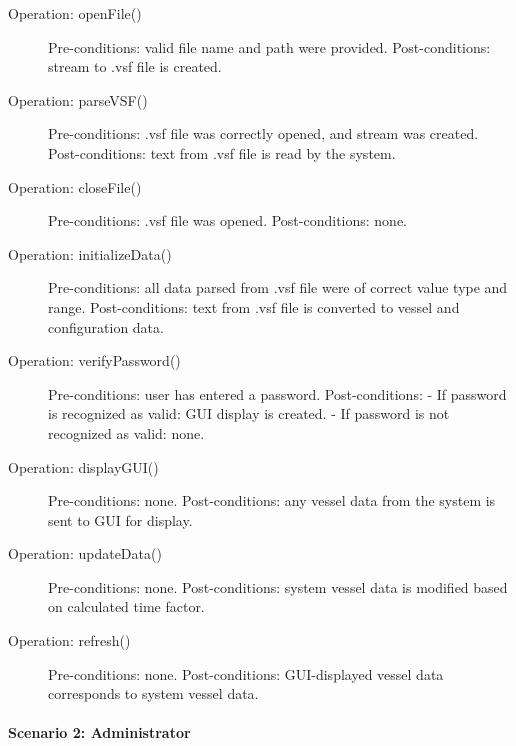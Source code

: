 \documentclass{article}
\begin{document}
\begin{description}
  \item[Operation: openFile()] Pre-conditions: valid file name and path were provided.\newline
  Post-conditions: stream to .vsf file is created.
  \item[Operation: parseVSF()] Pre-conditions: .vsf file was correctly opened, and stream was created.\newline
  Post-conditions: text from .vsf file is read by the system.
  \item[Operation: closeFile()] Pre-conditions: .vsf file was opened.\newline
  Post-conditions: none.
  \item[Operation: initializeData()] Pre-conditions: all data parsed from .vsf file were of correct value type and range.\newline
  Post-conditions: text from .vsf file is converted to vessel and configuration data.
  \item[Operation: verifyPassword()] Pre-conditions: user has entered a password.\newline
  Post-conditions:\newline
  - If password is recognized as valid: GUI display is created.\newline
  - If password is not recognized as valid: none.
  \item[Operation: displayGUI()] Pre-conditions: none.\newline
  Post-conditions: any vessel data from the system is sent to GUI for display.
  \item[Operation: updateData()] Pre-conditions: none.\newline
  Post-conditions: system vessel data is modified based on calculated time factor.
  \item[Operation: refresh()] Pre-conditions: none.\newline
  Post-conditions: GUI-displayed vessel data corresponds to system vessel data.
\end{description}

\break
\paragraph{Scenario 2: Administrator}
\end{document}
